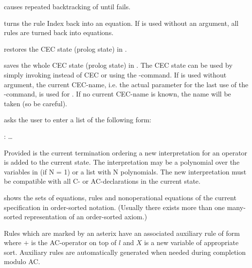 \begin{command}
causes repeated backtracking of  until  fails.
\end{command}
 
\begin{command}
turns the rule Index back into an equation. If 
is used without an argument, all rules are turned back into equations.
\end{command}


\begin{command}
restores the CEC state (prolog state) in . 
\end{command}

\begin{command}
saves the whole CEC state (prolog state) in . The CEC state
can be used by simply invoking  instead of CEC or 
using the -command.
If  is used without argument, the current CEC-name,
i.e. the actual parameter for the last use of the -command,
is used for . If no current CEC-name is known, the name
 will be taken (so be careful).
\end{command}

\begin{command}
asks the user to enter a list of the following form:
\begin{center}
\kw{[} : \kw{,} \ldots\kw{]}
\end{center}
Provided  is the current termination ordering a new interpretation
 for an operator  is added to the current state.
The interpretation
may be a polynomial over the variables in  (if
N = 1) or a list with N polynomials.
The new interpretation must be compatible
with all C- or AC-declarations in the current state.
\end{command}

 
\begin{command}
shows the sets of equations, rules and nonoperational equations of the 
current specification in order-sorted notation.
(Usually there exists more than one many-sorted representation of
an order-sorted axiom.)

Rules  which are marked by an asterix 
\kw{*} have an associated auxiliary rule of form
where $+$ is the AC-operator on top of $l$ and $X$ is a new
variable of appropriate sort.
Auxiliary rules are automatically generated when needed during
completion modulo AC.
\end{command}
 
